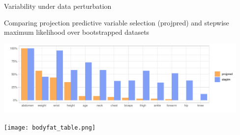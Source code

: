 \documentclass[t]{beamer}
\DeclareMathOperator{\N}{N}
\begin{document}

  



\begin{frame}{Variability under data perturbation}

   Comparing projection predictive variable selection (projpred)
    and stepwise maximum likelihood over bootstrapped datasets

  \vspace{-0.5\baselineskip}
  \begin{minipage}[t]{1\linewidth}
      \hspace{-1cm}
      \includegraphics[width=12.5cm]{inc_prob.pdf}
    \end{minipage}
    \pause
  \begin{minipage}[t]{1\linewidth}
      \hspace{-0.9cm}
      \texttt{[image: bodyfat\_table.png]}
    \end{minipage}

  \end{frame}
\end{document}
